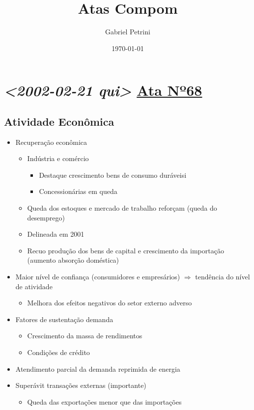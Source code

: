 \documentclass[11pt]{article}
\author{Gabriel Petrini}
\date{\today}
\title{Atas Compom}
\begin{document}
\maketitle
\tableofcontents


\section*{\textit{<2002-02-21 qui> } \href{https://www.bcb.gov.br/htms/copom/not2002022068.asp?frame=1}{Ata Nº68}}
\label{sec:org5b8f7fb}
\subsection*{Atividade Econômica}
\label{sec:org08f6db9}
\begin{itemize}
\item Recuperação econômica
\begin{itemize}
\item Indústria e comércio
\begin{itemize}
\item Destaque crescimento bens de consumo duráveisi
\item Concessionárias em queda
\end{itemize}
\item Queda dos estoques e mercado de trabalho reforçam (queda do desemprego)
\item Delineada em 2001
\item Recuo produção dos bens de capital e crescimento da importação (aumento absorção doméstica)
\end{itemize}
\item Maior nível de confiança (consumidores e empresários) \(\Rightarrow\) tendência do nível de atividade
\begin{itemize}
\item Melhora dos efeitos negativos do setor externo adverso
\end{itemize}
\item Fatores de sustentação demanda
\begin{itemize}
\item Crescimento da massa de rendimentos
\item Condições de crédito
\end{itemize}
\item Atendimento parcial da demanda reprimida de energia
\item Superávit transações externas (importante)
\begin{itemize}
\item Queda das exportações menor que das importações

\end{itemize}
\end{itemize}
\end{document}
